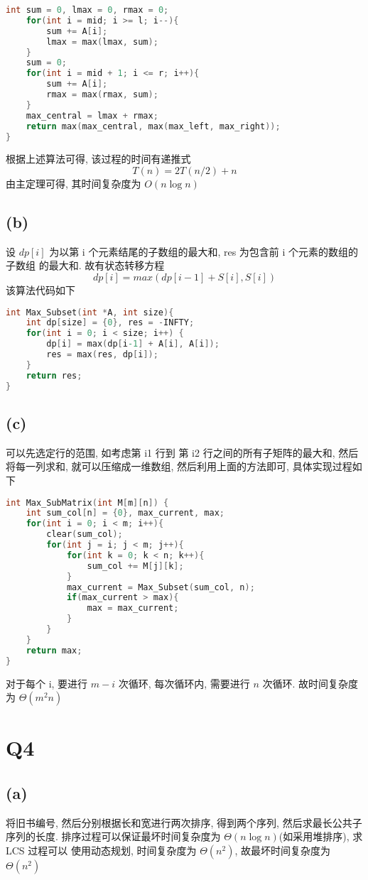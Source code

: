 \documentclass[UTF8]{ctexart}
\begin{document}
\begin{sloppypar}
\begin{lstlisting}[language=C]
    int sum = 0, lmax = 0, rmax = 0;
    for(int i = mid; i >= l; i--){
        sum += A[i];
        lmax = max(lmax, sum);
    }
    sum = 0;
    for(int i = mid + 1; i <= r; i++){
        sum += A[i];
        rmax = max(rmax, sum);
    }
    max_central = lmax + rmax;
    return max(max_central, max(max_left, max_right));
}
\end{lstlisting}
根据上述算法可得, 该过程的时间有递推式\[T(n) = 2T(n/2) + n\]
由主定理可得, 其时间复杂度为 $O(n\log n)$

\subsection*{(b)}
设 $dp[i]$ 为以第 i 个元素结尾的子数组的最大和, res 为包含前 i 个元素的数组的子数组
的最大和. 故有状态转移方程\[dp[i] = max(dp[i-1] + S[i], S[i])\]
该算法代码如下
\begin{lstlisting}[language=C] 
int Max_Subset(int *A, int size){
    int dp[size] = {0}, res = -INFTY;
    for(int i = 0; i < size; i++) {
        dp[i] = max(dp[i-1] + A[i], A[i]);
        res = max(res, dp[i]); 
    }
    return res;
}
\end{lstlisting}
\subsection*{(c)}
可以先选定行的范围, 如考虑第 i1 行到 第 i2 行之间的所有子矩阵的最大和, 然后将每一列求和,
就可以压缩成一维数组, 然后利用上面的方法即可, 具体实现过程如下
\begin{lstlisting}[language=C] 
int Max_SubMatrix(int M[m][n]) {
    int sum_col[n] = {0}, max_current, max;
    for(int i = 0; i < m; i++){
        clear(sum_col);
        for(int j = i; j < m; j++){
            for(int k = 0; k < n; k++){
                sum_col += M[j][k];
            }
            max_current = Max_Subset(sum_col, n);
            if(max_current > max){
                max = max_current;
            }
        }
    }
    return max;
}
\end{lstlisting}
对于每个 i, 要进行 $m - i$ 次循环, 每次循环内, 需要进行 $n$ 次循环. 故时间复杂度为
$\Theta(m^2n)$

\section*{Q4}
\subsection*{(a)}
将旧书编号, 然后分别根据长和宽进行两次排序, 得到两个序列, 然后求最长公共子序列的长度.
排序过程可以保证最坏时间复杂度为 $\Theta(n\log n)$(如采用堆排序), 求 LCS 过程可以
使用动态规划, 时间复杂度为 $\Theta(n^2)$, 故最坏时间复杂度为 $\Theta(n^2)$

\end{sloppypar}
\end{document}
